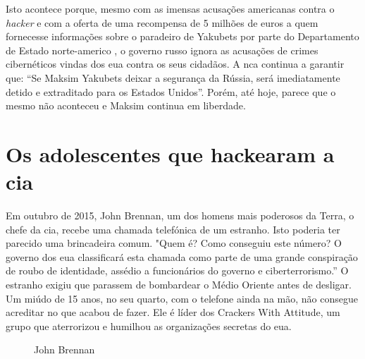 \documentclass{report}
\begin{document}
Isto acontece porque, mesmo com as imensas acusações americanas contra o \textit{hacker} e com a oferta de uma recompensa de 5 milhões de euros a quem fornecesse informações sobre o paradeiro de Yakubets por parte do Departamento de Estado norte-americo \cite{maksimprocurado}, o governo russo ignora as acusações de crimes cibernéticos vindas dos \ac{eua} contra os seus cidadãos. A \ac{nca} continua a garantir que: “Se Maksim Yakubets deixar a segurança da Rússia, será imediatamente detido e extraditado para os Estados Unidos”. Porém, até hoje, parece que o mesmo não aconteceu e Maksim continua em liberdade.

\section{Os adolescentes que hackearam a \ac{cia}}
Em outubro de 2015, John Brennan, um dos homens mais poderosos da Terra, o chefe da \ac{cia}, recebe uma chamada telefónica de um estranho. Isto poderia ter parecido uma brincadeira comum. "Quem é? Como conseguiu este número? O governo dos \ac{eua} classificará esta chamada como parte de uma grande conspiração de roubo de identidade, assédio a funcionários do governo e ciberterrorismo.” O estranho exigiu que parassem de bombardear o Médio Oriente antes de desligar. Um miúdo de 15 anos, no seu quarto, com o telefone ainda na mão, não consegue acreditar no que acabou de fazer. Ele é líder dos Crackers With Attitude, um grupo que aterrorizou e humilhou as organizações secretas do \ac{eua}. 

\begin{figure}[h]
    \center
    \caption{John Brennan}
    \label{johnbrennan}
\end{figure}
\end{document}
